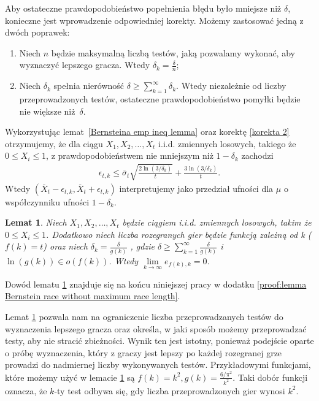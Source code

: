 \documentclass[inzynierska]{pwr_wmat_praca_dyplomowa}
\theoremstyle{plain}
\numberwithin{theorem}{chapter}
\newtheorem{lemma}[theorem]{Lemat}
\theoremstyle{definition}
\numberwithin{theorem}{chapter}
\newcommand{\newbrackets}[1]{\emph{(}{#1}\emph{)}}
\begin{document}
	Aby ostateczne prawdopodobieństwo popełnienia błędu było mniejsze niż $\delta$, konieczne jest wprowadzenie odpowiedniej korekty.
	Możemy zastosować jedną z dwóch poprawek:
	\begin{enumerate}[label=\thesection.\arabic*]
		\item \label{korekta 1} Niech $n$ będzie maksymalną liczbą testów, jaką pozwalamy wykonać, aby wyznaczyć lepszego
		gracza. Wtedy $\delta_k=\frac{\delta}{n}$;
		\item \label{korekta 2} Niech $\delta_k$ spełnia nierówność $ \delta \ge \sum_{k = 1}^{\infty}\delta_k$. Wtedy niezależnie od
		liczby przeprowadzonych testów, ostateczne
		prawdopodobieństwo pomyłki będzie nie większe niż~$\delta$.
	\end{enumerate}
	Wykorzystując lemat~\ref{Bernsteina emp ineq lemma} oraz korektę \ref{korekta 2} otrzymujemy, że dla ciągu $X_1, X_2, \dots, X_t$ i.i.d. zmiennych losowych, takiego że  $0 \le X_i \le 1$, z prawdopodobieństwem nie mniejszym niż $1-\delta_k$ zachodzi
	\begin{align}
		\label{Bernstein race without maximum race length}
		\epsilon_{t, k} \le \overline{\sigma}_t \sqrt{\frac{2\ln(3/\delta_k)}{t}} + \frac{3  \ln{(3 / \delta_k)}}{t}.
	\end{align}
	Wtedy $(\overline{X}_t - \epsilon_{t,k}, \overline{X}_t + \epsilon_{t,k})$ interpretujemy jako przedział ufności dla $\mu$ o współczynniku ufności $1-\delta_k$.
	\begin{lemma}
		\label{lemma Bernstein race without maximum race length}
		Niech $X_1, X_2, \dots, X_t$ będzie ciągiem i.i.d. zmiennych losowych, takim że  $0 \le X_i \le 1$. Dodatkowo niech liczba rozegranych gier będzie funkcją zależną od k \newbrackets{$f(k) = t$}
		oraz niech $\delta_k = \frac{\delta}{g(k)}$
		, gdzie $\delta \ge \sum_{k=1}^{\infty} \frac{\delta}{g(k)}$ i $\ln(g(k)) \in o(f(k))$. Wtedy
		$\lim\limits_{k\to\infty} e_{f(k), k} = 0$. 
	\end{lemma}
	\noindent
	Dowód lematu \ref{lemma Bernstein race without maximum race length} znajduje się na końcu niniejszej pracy w dodatku	\ref{proof:lemma Bernstein race without maximum race length}.
	
	Lemat \ref{lemma Bernstein race without maximum race length} pozwala nam na ograniczenie liczba przeprowadzanych testów do wyznaczenia lepszego gracza oraz określa, w jaki sposób możemy  przeprowadzać  testy, aby nie stracić zbieżności.
	Wynik ten jest istotny, ponieważ podejście oparte o próbę wyznaczenia, który z graczy jest lepszy po każdej rozegranej grze prowadzi do nadmiernej liczby wykonywanych testów.
	Przykładowymi funkcjami, które możemy użyć w %
	 lemacie \ref{lemma Bernstein race without maximum race length} są $f(k) = k^2, g(k) = \frac{6/\pi^2}{k^2}$. Taki dobór funkcji oznacza, że $k$-ty test odbywa się, gdy liczba przeprowadzonych gier wynosi $k^2$.
\end{document}
